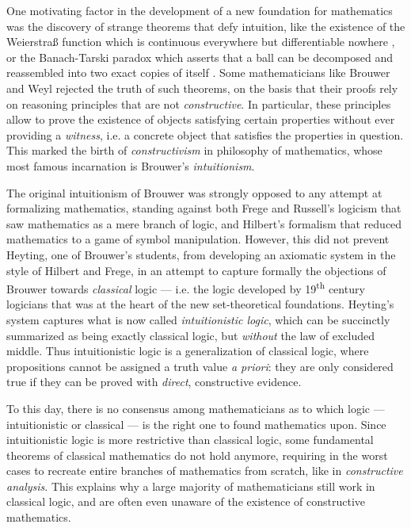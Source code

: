 One motivating factor in the development of a new foundation for mathematics was
the discovery of strange theorems that defy intuition, like the existence of the
Weierstra{\ss} function which is continuous everywhere but differentiable
nowhere , or the Banach-Tarski paradox which
asserts that a ball can be decomposed and reassembled into two exact copies of
itself . Some mathematicians like Brouwer and Weyl
rejected the truth of such theorems, on the basis that their proofs rely on
reasoning principles that are not \emph{constructive}. In particular, these principles
allow to prove the existence of objects satisfying certain properties without
ever providing a \emph{witness}, i.e. a concrete object that satisfies the
properties in question. This marked the birth of \emph{constructivism} in
philosophy of mathematics, whose most famous incarnation is Brouwer's
\emph{intuitionism}.

The original intuitionism of Brouwer was strongly opposed to any attempt at
formalizing mathematics, standing against both Frege and Russell's logicism that
saw mathematics as a mere branch of logic, and Hilbert's formalism that reduced
mathematics to a game of symbol manipulation. However, this did not prevent
Heyting, one of Brouwer's students, from developing an axiomatic system in the
style of Hilbert and Frege, in an attempt to capture formally the objections of
Brouwer towards \emph{classical} logic --- i.e. the logic developed by
19\textsuperscript{th} century logicians that was at the heart of the new
set-theoretical foundations. Heyting's system captures what is now called
\emph{intuitionistic logic}, which can be succinctly summarized as being exactly
classical logic, but \emph{without} the law of excluded middle. Thus
intuitionistic logic is a generalization of classical logic, where propositions
cannot be assigned a truth value \emph{a priori}: they are only considered true
if they can be proved with \emph{direct}, constructive evidence.

To this day, there is no consensus among mathematicians as to which logic ---
intuitionistic or classical --- is the right one to found mathematics upon.
Since intuitionistic logic is more restrictive than classical logic, some
fundamental theorems of classical mathematics do not hold anymore, requiring in
the worst cases to recreate entire branches of mathematics from scratch, like in
\emph{constructive analysis}. This explains why a large majority of
mathematicians still work in classical logic, and are often even unaware of the
existence of constructive mathematics.

